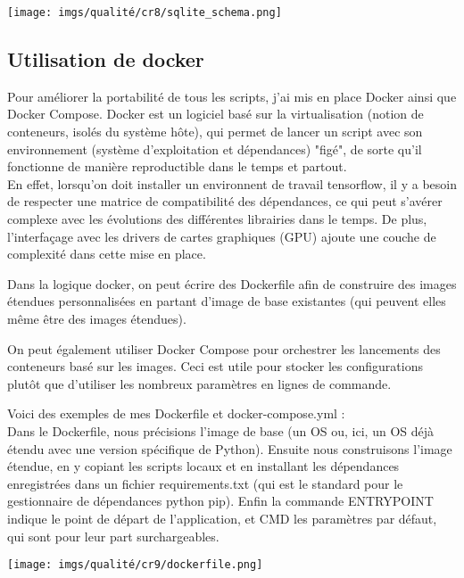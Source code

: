 \begin{center}
    \texttt{[image: imgs/qualité/cr8/sqlite\_schema.png]}
\end{center}

\subsection{Utilisation de \Gls{docker}}
Pour améliorer la portabilité de tous les scripts, j'ai mis en place Docker ainsi que Docker Compose. Docker est un logiciel basé sur la virtualisation (notion de conteneurs, isolés du système hôte), qui permet de lancer un script avec son environnement (système d'exploitation et dépendances) "figé", de sorte qu'il fonctionne de manière reproductible dans le temps et partout.\\

En effet, lorsqu'on doit installer un environnent de travail \gls{tensorflow}, il y a besoin de respecter une matrice de compatibilité des dépendances, ce qui peut s'avérer complexe avec les évolutions des différentes librairies dans le temps. De plus, l'interfaçage avec les drivers de cartes graphiques (GPU) ajoute une couche de complexité dans cette mise en place. 

Dans la logique \Gls{docker}, on peut écrire des Dockerfile afin de construire des images étendues personnalisées en partant d'image de base existantes (qui peuvent elles même être des images étendues).

On peut également utiliser Docker Compose pour orchestrer les lancements des conteneurs basé sur les images. Ceci est utile pour stocker les configurations plutôt que d'utiliser les nombreux paramètres en lignes de commande.

Voici des exemples de mes Dockerfile et docker-compose.yml : \\

Dans le Dockerfile, nous précisions l'image de base (un OS ou, ici, un OS déjà étendu avec une version spécifique de Python). Ensuite nous construisons l'image étendue, en y copiant les scripts locaux et en installant les dépendances enregistrées dans un fichier requirements.txt (qui est le standard pour le gestionnaire de dépendances python pip). Enfin la commande ENTRYPOINT indique le point de départ de l'application, et CMD les paramètres par défaut, qui sont pour leur part surchargeables.
\begin{center}
    \texttt{[image: imgs/qualité/cr9/dockerfile.png]}
\end{center}

